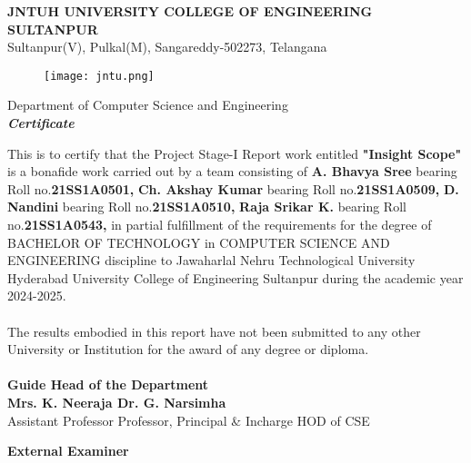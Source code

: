 \documentclass[12pt,a4paper]{report}
\begin{document}
 \newpage 
{}\setcounter{page}{2}
\begin{center}
	
	{\large\textbf{JNTUH UNIVERSITY COLLEGE OF ENGINEERING SULTANPUR}}\\
	\textup{\normalsize {Sultanpur(V), Pulkal(M), Sangareddy-502273, Telangana}}\\[1cm]
	\begin{figure}[h!]
		\centering
		\texttt{[image: jntu.png]}
		\centering
	\end{figure}
	{\large\textup {Department of Computer Science and Engineering}}\\[1.0cm]
	{\Large \textbf{\textit{Certificate}}}\\
	\vspace{0.5cm}
	
\end{center}
This is to certify that the Project Stage-I Report work entitled \textbf{"Insight Scope"} is a bonafide work carried out by a team consisting of \textbf{A. Bhavya Sree} bearing Roll no.\textbf{21SS1A0501,}
\textbf{Ch. Akshay Kumar} bearing Roll no.\textbf{21SS1A0509,} \textbf{D. Nandini} bearing Roll no.\textbf{21SS1A0510,} \textbf{Raja Srikar K.} bearing Roll no.\textbf{21SS1A0543,} in partial fulfillment of the requirements for the degree of BACHELOR OF TECHNOLOGY in COMPUTER SCIENCE AND ENGINEERING discipline to  Jawaharlal Nehru Technological University Hyderabad University College of Engineering Sultanpur during the academic year 2024-2025.\\ \\
The results embodied in this report have not been submitted to any other University or Institution for the award of any degree or diploma.\\
\vspace{1cm}\\
\textbf{Guide \hspace{2.18in}   Head of the Department\\}
\textbf{Mrs. K. Neeraja \hspace{1.46in}  Dr. G. Narsimha \\}
{Assistant Professor \hspace{1.35in}  Professor, Principal \& Incharge HOD of CSE}
\begin{center}
	\vspace{0.5 cm}
	\textbf{External Examiner}
\end{center}
\end{document}
